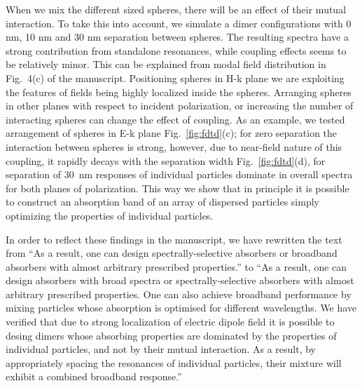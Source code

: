 \documentclass[a4paper]{article}
\begin{document}
When we mix the different sized spheres, there will be an effect of
their mutual interaction. To take this into account, we simulate a
dimer configurations with 0 nm, 10 nm and 30 nm separation between
spheres.  The resulting spectra have a strong contribution from
standalone resonances, while coupling effects seems to be relatively
minor. This can be explained from modal field distribution in
Fig.~4(c) of the manuscript. Positioning spheres in H-k plane we are
exploiting the features of fields being highly localized inside the
spheres. Arranging spheres in other planes with respect to incident
polarization, or increasing the number of interacting spheres can
change the effect of coupling. As an example, we tested arrangement of
spheres in E-k plane Fig.~\ref{fig:fdtd}(c); for zero separation the
interaction between spheres is strong, however, due to near-field
nature of this coupling, it rapidly decays with the separation width
Fig.~\ref{fig:fdtd}(d), for separation of 30~nm responses of
individual particles dominate in overall spectra for both planes of
polarization. This way we show that in principle it is possible to
construct an absorption band of an array of dispersed particles simply
optimizing the properties of individual particles.

In order to reflect these findings in the manuscript, we have
rewritten the text from ``As a result, one can design
spectrally-selective absorbers or broadband absorbers with almost
arbitrary prescribed properties.'' to ``As a result, one can design
absorbers with broad spectra or spectrally-selective absorbers with
almost arbitrary prescribed properties.  One can also achieve
broadband performance by mixing particles whose absorption is
optimised for different wavelengths. We have verified that due to
strong localization of electric dipole field it is possible to desing
dimers whose absorbing properties are dominated by the properties of
individual particles, and not by their mutual interaction. As a
result, by appropriately spacing the resonances of individual
particles, their mixture will exhibit a combined broadband response.''

\end{document}
